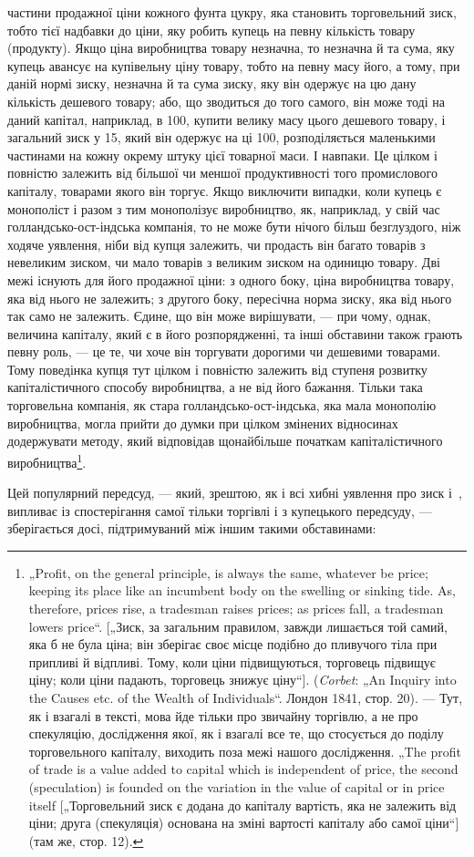 \parcont{}  %
частини продажної ціни кожного фунта цукру, яка становить
торговельний зиск, тобто тієї надбавки до ціни, яку робить
купець на певну кількість товару (продукту). Якщо ціна виробництва
товару незначна, то незначна й та сума, яку купець
авансує на купівельну ціну товару, тобто на певну масу його,
а тому, при даній нормі зиску, незначна й та сума зиску, яку
він одержує на цю дану кількість дешевого товару; або, що
зводиться до того самого, він може тоді на даний капітал, наприклад,
в 100, купити велику масу цього дешевого товару,
і загальний зиск у 15, який він одержує на ці 100, розподіляється
маленькими частинами на кожну окрему штуку цієї товарної
маси. І навпаки. Це цілком і повністю залежить від більшої
чи меншої продуктивності того промислового капіталу, товарами
якого він торгує. Якщо виключити випадки, коли купець є монополіст
і разом з тим монополізує виробництво, як, наприклад,
у свій час голландсько-ост-індська компанія, то не може бути
нічого більш безглуздого, ніж ходяче уявлення, ніби від купця
залежить, чи продасть він багато товарів з невеликим зиском,
чи мало товарів з великим зиском на одиницю товару. Дві
межі існують для його продажної ціни: з одного боку, ціна виробництва
товару, яка від нього не залежить; з другого боку, пересічна
норма зиску, яка від нього так само не залежить. Єдине,
що він може вирішувати, — при чому, однак, величина капіталу,
який є в його розпорядженні, та інші обставини також грають
певну роль, — це те, чи хоче він торгувати дорогими чи дешевими
товарами. Тому поведінка купця тут цілком і повністю залежить
від ступеня розвитку капіталістичного способу виробництва,
а не від його бажання. Тільки така торговельна компанія, як стара
голландсько-ост-індська, яка мала монополію виробництва, могла
прийти до думки при цілком змінених відносинах додержувати
методу, який відповідав щонайбільше початкам капіталістичного
виробництва\footnote{
„Profit, on the general principle, is always the same, whatever be price;
keeping its place like an incumbent body on the swelling or sinking tide. As,
therefore, prices rise, a tradesman raises prices; as prices fall, a tradesman lowers
price“. [„Зиск, за загальним правилом, завжди лишається той самий, яка б не була
ціна; він зберігає своє місце подібно до пливучого тіла при припливі й відпливі.
Тому, коли ціни підвищуються, торговець підвищує ціну; коли ціни падають,
торговець знижує ціну“]. (\emph{Corbet}: „An Inquiry into the Causes etc. of the Wealth
of Individuals“. Лондон 1841, стор. 20). — Тут, як і взагалі в тексті, мова йде
тільки про звичайну торгівлю, а не про спекуляцію, дослідження якої, як і взагалі
все те, що стосується до поділу торговельного капіталу, виходить поза
межі нашого дослідження. „The profit of trade is a value added to capital which
is independent of price, the second (speculation) is founded on the variation in
the value of capital or in price itself [„Торговельний зиск є додана до капіталу
вартість, яка не залежить від ціни; друга (спекуляція) основана на зміні вартості
капіталу або самої ціни“] (там же, стор. 12).
}.

Цей популярний передсуд, — який, зрештою, як і всі хибні
уявлення про зиск і~, випливає із спостерігання самої тільки
торгівлі і з купецького передсуду, — зберігається досі, підтримуваний
між іншим такими обставинами:
